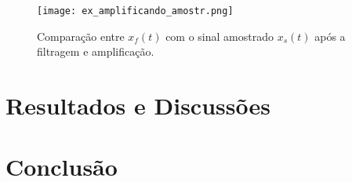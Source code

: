 \documentclass[journal]{IEEEtran}
\begin{document}
\begin{figure}[H]
\captionsetup{justification=centering}
\centering %
\texttt{[image: ex\_amplificando\_amostr.png]} %
\caption{Comparação entre $x$$_f$$(t)$ com o sinal amostrado $x$$_s$$(t)$ após a filtragem e amplificação.}
\end{figure}

\section{Resultados e Discussões}
\section{Conclusão}


%
%
%


\end{document}
